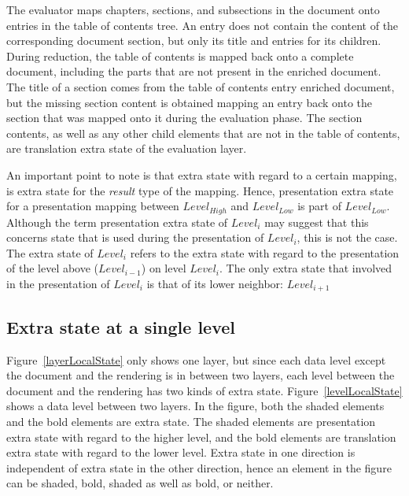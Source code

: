 The evaluator maps chapters, sections, and subsections in the document onto entries in the table of contents tree. An  entry does not contain the content of the corresponding document section, but only its title and entries for its children. During reduction, the table of contents is mapped back onto a complete document, including the parts that are not present in the enriched document. The title of a section comes from the table of contents entry enriched document, but the missing section content is obtained mapping an entry back onto the section that was mapped onto it during the evaluation phase. The section contents, as well as any other child elements that are not in the table of contents, are translation extra state of the evaluation layer.
 

An important point to note is that extra state with regard to a certain mapping, is extra state for the {\em result} type of the mapping. Hence, presentation extra state for a presentation mapping between $Level_{High}$ and $Level_{Low}$ is part of $Level_{Low}$. Although the term presentation extra state of $Level_i$ may suggest that this concerns state that is used during the presentation of $Level_i$, this is not the case. The extra state of $Level_i$ refers to the extra state with regard to the presentation of the level above ($Level_{i-1}$) on level $Level_i$. The only extra state that involved in the presentation of $Level_i$ is that of its lower neighbor: $Level_{i+1}$


%										
%										
\subsection{Extra state at a single level}

Figure~\ref{layerLocalState} only shows one layer, but since each data level except the document and the rendering is in between two layers, each level between the document and the rendering has two kinds of extra state. Figure~\ref{levelLocalState} shows a data level between two layers. In the figure, both the shaded elements and the bold elements are extra state. The shaded elements are presentation extra state with regard to the higher level, and the bold elements are translation extra state with regard to the lower level. Extra state in one direction is independent of extra state in the other direction, hence an element in the figure can be shaded, bold, shaded as well as bold, or neither. 

